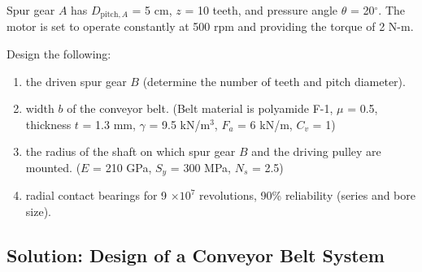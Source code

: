 \documentclass[a4paper,openany,svgnames]{kaobook}
\begin{document}
Spur gear \(A\) has \(D_{\text{pitch},A}\) = 5 cm, \(z\) = 10 teeth, and
pressure angle \(\theta\) = 20\(^{\circ}\). The motor is set to operate
constantly at 500 rpm and providing the torque of 2 N-m.

Design the following:

\begin{enumerate}
\item the driven spur gear \(B\) (determine the number of teeth and pitch
diameter).

\item width \(b\) of the conveyor belt. (Belt material is polyamide F-1,
\(\mu\) = 0.5, thickness \(t\) = 1.3 mm, \(\gamma\) = 9.5
kN/m\(^{3}\), \(F_{a}\) = 6 kN/m, \(C_{v}\) = 1)

\item the radius of the shaft on which spur gear \(B\) and the driving
pulley are mounted. (\(E\) = 210 GPa, \(S_{y}\) = 300 MPa, \(N_{s}\)
= 2.5)

\item radial contact bearings for 9 \(\times 10^{7}\) revolutions, 90\%
reliability (series and bore size).
\end{enumerate}

\subsection{Solution: Design of a Conveyor Belt System}
\label{sec:org5455c09}
\end{document}
